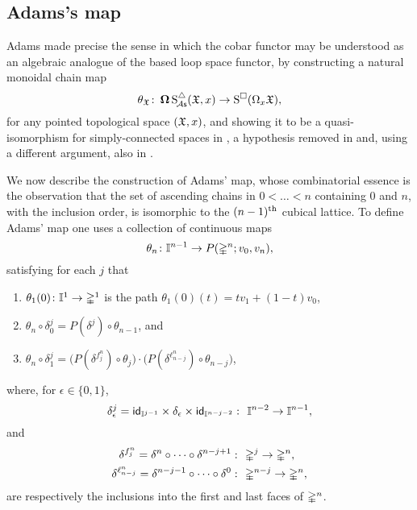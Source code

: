\subsection{Adams's map}\label{ss:adams maps}

Adams made precise the sense in which the cobar functor may be understood as an algebraic analogue of the based loop space functor, by constructing a natural monoidal chain map
\begin{equation}\label{e:adams map 2}
	\theta_{\mathfrak{X}} \colon \operatorname{\mathbf{\Omega}} \operatorname{S^{\triangle}_{\!{\mathcal{A}\mathsf{s}}}}(\mathfrak{X},x) \to \operatorname{S^{\square}}(\Omega_x \mathfrak{X}),
\end{equation}
for any pointed topological space $(\mathfrak{X},x)$, and showing it to be a quasi-isomorphism for simply-connected spaces in \cite{adams1956cobar}, a hypothesis removed in \cite{rivera2018cubical} and, using a different argument, also in \cite{rivera2019path}.

We now describe the construction of Adams' map, whose combinatorial essence is the observation that the set of ascending chains in $0 < \dots < n$ containing $0$ and $n$, with the inclusion order, is isomorphic to the $(n-1)^{\mathrm{th}}$ cubical lattice.
To define Adams' map one uses a collection of continuous maps
\[
\theta_n \colon \mathbb{I}^{n-1} \to P(\mathbb{\Delta}^n;v_0,v_n),
\]
satisfying for each $j$ that
\begin{enumerate}
	\item $\theta_1(0)\colon \mathbb{I}^1 \to \mathbb{\Delta}^1$ is the path $\theta_1(0)(t) = tv_1 +(1-t)v_0$,
	\item $\theta_n \circ \delta_0^j = P(\delta^j) \circ \theta_{n-1}$, and
	\item $\theta_n \circ \delta_1^j =
	\big(P(\delta^{f^n_j}) \circ \theta_j\big) \cdot \big(P(\delta^{\ell^n_{n-j}}) \circ \theta_{n-j}\big)$,
\end{enumerate}
where, for $\epsilon \in \{0,1\}$,
\[
\delta_\epsilon^j = \id_{\gcube^{j-1}} \times \delta_\epsilon \times \id_{\gcube^{n-j-2}} \,\colon\ \gcube^{n-2} \to \gcube^{n-1},
\]
and
\[
\begin{split}
	\delta^{f^n_j} = \delta^n \circ \dotsb \circ \delta^{n-j+1} &\,\colon\ \mathbb{\Delta}^j \to \mathbb{\Delta}^n, \\
	\delta^{\ell^n_{n-j}} = \delta^{n-j-1} \circ \dotsb \circ \delta^{0} &\, \colon\ \mathbb{\Delta}^{n-j} \to \mathbb{\Delta}^n,
\end{split}
\]
are respectively the inclusions into the first and last faces of $\mathbb{\Delta}^n$.

